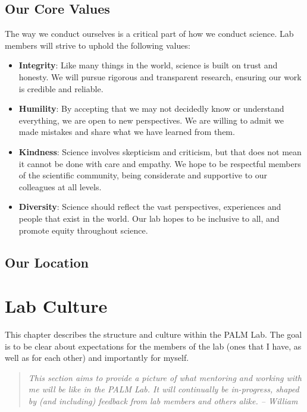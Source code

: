 \documentclass[
]{book}
\begin{document}
\hypertarget{lab-values}{%
\section{Our Core Values}\label{lab-values}}

The way we conduct ourselves is a critical part of how we conduct science. Lab members will strive to uphold the following values:

\begin{itemize}
\item
  \textbf{Integrity}: Like many things in the world, science is built on trust and honesty. We will pursue rigorous and transparent research, ensuring our work is credible and reliable.
\item
  \textbf{Humility}: By accepting that we may not decidedly know or understand everything, we are open to new perspectives. We are willing to admit we made mistakes and share what we have learned from them.
\item
  \textbf{Kindness}: Science involves skepticism and criticism, but that does not mean it cannot be done with care and empathy. We hope to be respectful members of the scientific community, being considerate and supportive to our colleagues at all levels.
\item
  \textbf{Diversity}: Science should reflect the vast perspectives, experiences and people that exist in the world. Our lab hopes to be inclusive to all, and promote equity throughout science.
\end{itemize}

\hypertarget{our-location}{%
\section{Our Location}\label{our-location}}

\hypertarget{lab-culture}{%
\chapter{Lab Culture}\label{lab-culture}}

This chapter describes the structure and culture within the PALM Lab. The goal is to be clear about expectations for the members of the lab (ones that I have, as well as for each other) and importantly for myself.

\begin{quote}
\emph{This section aims to provide a picture of what mentoring and working with me will be like in the PALM Lab. It will continually be in-progress, shaped by (and including) feedback from lab members and others alike. -- William}
\end{quote}
\end{document}
